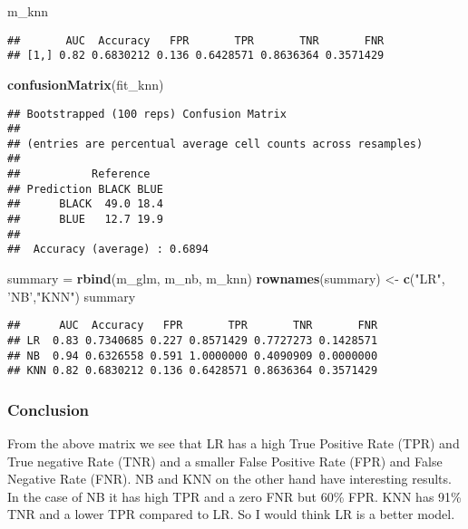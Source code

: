 \documentclass[
]{article}
\newenvironment{Shaded}{\begin{snugshade}}{\end{snugshade}}
\newcommand{\KeywordTok}[1]{\textcolor[rgb]{0.13,0.29,0.53}{\textbf{#1}}}
\newcommand{\NormalTok}[1]{#1}
\newcommand{\StringTok}[1]{\textcolor[rgb]{0.31,0.60,0.02}{#1}}
\begin{document}
\begin{Shaded}
\begin{Highlighting}[]
\NormalTok{m_knn}
\end{Highlighting}
\end{Shaded}

\begin{verbatim}
##       AUC  Accuracy   FPR       TPR       TNR       FNR
## [1,] 0.82 0.6830212 0.136 0.6428571 0.8636364 0.3571429
\end{verbatim}

\begin{Shaded}
\begin{Highlighting}[]
\KeywordTok{confusionMatrix}\NormalTok{(fit_knn)}
\end{Highlighting}
\end{Shaded}

\begin{verbatim}
## Bootstrapped (100 reps) Confusion Matrix 
## 
## (entries are percentual average cell counts across resamples)
##  
##           Reference
## Prediction BLACK BLUE
##      BLACK  49.0 18.4
##      BLUE   12.7 19.9
##                             
##  Accuracy (average) : 0.6894
\end{verbatim}

\begin{Shaded}
\begin{Highlighting}[]
\NormalTok{summary =}\StringTok{ }\KeywordTok{rbind}\NormalTok{(m_glm, m_nb, m_knn)}
\KeywordTok{rownames}\NormalTok{(summary) <-}\StringTok{ }\KeywordTok{c}\NormalTok{(}\StringTok{"LR"}\NormalTok{, }\StringTok{'NB'}\NormalTok{,}\StringTok{"KNN"}\NormalTok{)}
\NormalTok{summary}
\end{Highlighting}
\end{Shaded}

\begin{verbatim}
##      AUC  Accuracy   FPR       TPR       TNR       FNR
## LR  0.83 0.7340685 0.227 0.8571429 0.7727273 0.1428571
## NB  0.94 0.6326558 0.591 1.0000000 0.4090909 0.0000000
## KNN 0.82 0.6830212 0.136 0.6428571 0.8636364 0.3571429
\end{verbatim}

\hypertarget{conclusion}{%
\subsubsection{Conclusion}\label{conclusion}}

From the above matrix we see that LR has a high True Positive Rate (TPR)
and True negative Rate (TNR) and a smaller False Positive Rate (FPR) and
False Negative Rate (FNR). NB and KNN on the other hand have interesting
results. In the case of NB it has high TPR and a zero FNR but 60\% FPR.
KNN has 91\% TNR and a lower TPR compared to LR. So I would think LR is
a better model.
\end{document}

